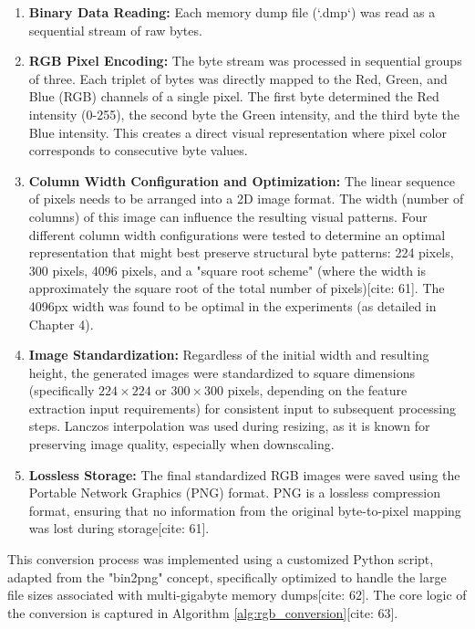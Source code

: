 \begin{enumerate}
    \item \textbf{Binary Data Reading:} Each memory dump file (`.dmp`) was read as a sequential stream of raw bytes.
    \item \textbf{RGB Pixel Encoding:} The byte stream was processed in sequential groups of three. Each triplet of bytes was directly mapped to the Red, Green, and Blue (RGB) channels of a single pixel. The first byte determined the Red intensity (0-255), the second byte the Green intensity, and the third byte the Blue intensity. This creates a direct visual representation where pixel color corresponds to consecutive byte values.
    \item \textbf{Column Width Configuration and Optimization:} The linear sequence of pixels needs to be arranged into a 2D image format. The width (number of columns) of this image can influence the resulting visual patterns. Four different column width configurations were tested to determine an optimal representation that might best preserve structural byte patterns: 224 pixels, 300 pixels, 4096 pixels, and a "square root scheme" (where the width is approximately the square root of the total number of pixels)[cite: 61]. The 4096px width was found to be optimal in the experiments (as detailed in Chapter 4).
    \item \textbf{Image Standardization:} Regardless of the initial width and resulting height, the generated images were standardized to square dimensions (specifically $224 \times 224$ or $300 \times 300$ pixels, depending on the feature extraction input requirements) for consistent input to subsequent processing steps. Lanczos interpolation was used during resizing, as it is known for preserving image quality, especially when downscaling.
    \item \textbf{Lossless Storage:} The final standardized RGB images were saved using the Portable Network Graphics (PNG) format. PNG is a lossless compression format, ensuring that no information from the original byte-to-pixel mapping was lost during storage[cite: 61].
\end{enumerate}

This conversion process was implemented using a customized Python script, adapted from the "bin2png" concept, specifically optimized to handle the large file sizes associated with multi-gigabyte memory dumps[cite: 62]. The core logic of the conversion is captured in Algorithm \ref{alg:rgb_conversion}[cite: 63].

